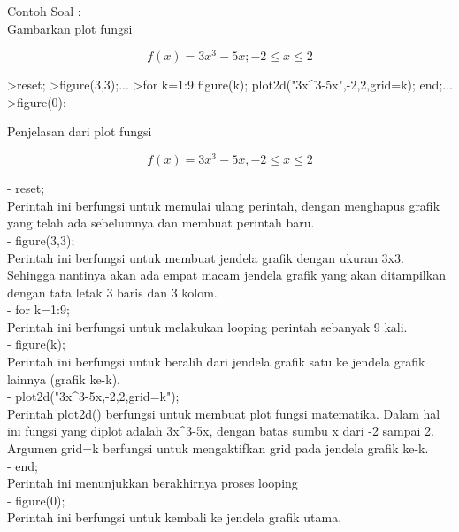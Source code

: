 \documentclass{article}
\begin{document}
\begin{eulernotebook}
\begin{eulercomment}
\end{eulercomment}
\eulersubheading{}
\begin{eulercomment}
Contoh Soal :\\
Gambarkan plot fungsi\\
\end{eulercomment}
\begin{eulerformula}
\[
f(x)= 3x^3 - 5x; -2 \leq x \leq 2
\]
\end{eulerformula}
\begin{eulerprompt}
>reset;
>figure(3,3);...
>for k=1:9 figure(k); plot2d("3x^3-5x",-2,2,grid=k); end;...
>figure(0):
\end{eulerprompt}
\begin{eulercomment}
Penjelasan dari plot fungsi\\
\end{eulercomment}
\begin{eulerformula}
\[
f(x)= 3x^3-5x, -2 \leq x \leq 2
\]
\end{eulerformula}
\begin{eulercomment}
- reset;\\
Perintah ini berfungsi untuk memulai ulang perintah, dengan menghapus
grafik yang telah ada sebelumnya dan membuat perintah baru.\\
- figure(3,3);\\
Perintah ini berfungsi untuk membuat jendela grafik dengan ukuran 3x3.
Sehingga nantinya akan ada empat macam jendela grafik yang akan
ditampilkan dengan tata letak 3 baris dan 3 kolom.\\
- for k=1:9;\\
Perintah ini berfungsi untuk melakukan looping perintah sebanyak 9
kali.\\
- figure(k);\\
Perintah ini berfungsi untuk beralih dari jendela grafik satu ke
jendela grafik lainnya (grafik ke-k).\\
- plot2d("3x\textasciicircum{}3-5x,-2,2,grid=k");\\
Perintah plot2d() berfungsi untuk membuat plot fungsi matematika.
Dalam hal ini fungsi yang diplot adalah 3x\textasciicircum{}3-5x, dengan batas sumbu x
dari -2 sampai 2. Argumen grid=k berfungsi untuk mengaktifkan grid
pada jendela grafik ke-k.\\
- end;\\
Perintah ini menunjukkan berakhirnya proses looping\\
- figure(0);\\
Perintah ini berfungsi untuk kembali ke jendela grafik utama.


\end{eulercomment}
\end{eulernotebook}
\end{document}
